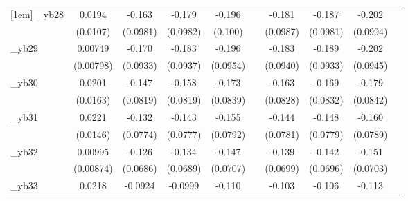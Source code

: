 \begin{table}[htbp]
\begin{tabular}{l*{9}{c}}
[1em]
\_yb28       &      0.0194\sym{*}  &      -0.163\sym{*}  &      -0.179\sym{*}  &      -0.196\sym{*}  &                     &      -0.181\sym{*}  &      -0.187\sym{*}  &      -0.202\sym{**} &                     \\
            &    (0.0107)         &    (0.0981)         &    (0.0982)         &     (0.100)         &                     &    (0.0987)         &    (0.0981)         &    (0.0994)         &                     \\
[1em]
\_yb29       &     0.00749         &      -0.170\sym{*}  &      -0.183\sym{*}  &      -0.196\sym{**} &                     &      -0.183\sym{*}  &      -0.189\sym{**} &      -0.202\sym{**} &                     \\
            &   (0.00798)         &    (0.0933)         &    (0.0937)         &    (0.0954)         &                     &    (0.0940)         &    (0.0933)         &    (0.0945)         &                     \\
[1em]
\_yb30       &      0.0201         &      -0.147\sym{*}  &      -0.158\sym{*}  &      -0.173\sym{**} &                     &      -0.163\sym{**} &      -0.169\sym{**} &      -0.179\sym{**} &                     \\
            &    (0.0163)         &    (0.0819)         &    (0.0819)         &    (0.0839)         &                     &    (0.0828)         &    (0.0832)         &    (0.0842)         &                     \\
[1em]
\_yb31       &      0.0221         &      -0.132\sym{*}  &      -0.143\sym{*}  &      -0.155\sym{*}  &                     &      -0.144\sym{*}  &      -0.148\sym{*}  &      -0.160\sym{**} &                     \\
            &    (0.0146)         &    (0.0774)         &    (0.0777)         &    (0.0792)         &                     &    (0.0781)         &    (0.0779)         &    (0.0789)         &                     \\
[1em]
\_yb32       &     0.00995         &      -0.126\sym{*}  &      -0.134\sym{*}  &      -0.147\sym{**} &                     &      -0.139\sym{**} &      -0.142\sym{**} &      -0.151\sym{**} &                     \\
            &   (0.00874)         &    (0.0686)         &    (0.0689)         &    (0.0707)         &                     &    (0.0699)         &    (0.0696)         &    (0.0703)         &                     \\
[1em]
\_yb33       &      0.0218         &     -0.0924\sym{*}  &     -0.0999\sym{*}  &      -0.110\sym{**} &                     &      -0.103\sym{*}  &      -0.106\sym{*}  &      -0.113\sym{**} &                     \\

\end{tabular}
\end{table}
